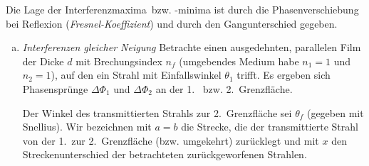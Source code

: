 Die Lage der Interferenzmaxima~bzw. -minima ist durch die
Phasenverschiebung bei Reflexion
(\emph{Fresnel-Koeffizient}) und durch den
Gangunterschied gegeben.
\begin{enumerate}[a)]
\item \emph{Interferenzen gleicher Neigung}
Betrachte einen ausgedehnten, parallelen Film der Dicke
$d$ mit Brechungsindex
$n_f$ (umgebendes Medium habe $n_1=1$ und $n_2=1$), auf den ein Strahl mit
Einfallswinkel $\theta_1$ trifft. 
Es ergeben sich Phasensprünge $\Delta\Phi_1$ und $\Delta\Phi_2$ an der
1.~ bzw. 2.~Grenzfläche.

Der Winkel des transmittierten Strahls zur 2.~Grenzfläche sei
$\theta_f$ (gegeben mit Snellius).
Wir bezeichnen mit $a=b$ die Strecke, die der transmittierte Strahl
von der 1.~zur 2.~Grenzfläche (bzw. umgekehrt) zurücklegt und mit $x$
den Streckenunterschied der betrachteten zurückgeworfenen Strahlen.


\end{enumerate}
